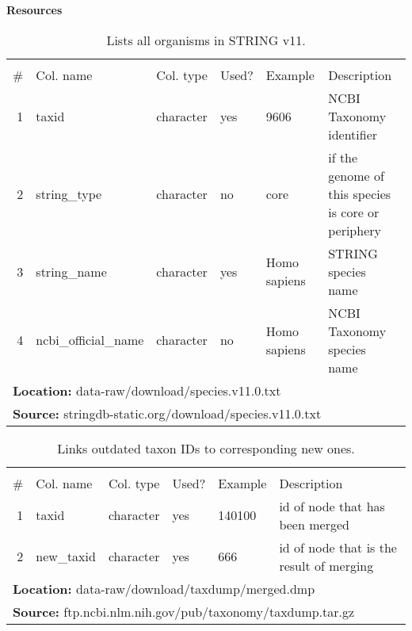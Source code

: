 \textbf{Resources}

\begin{table}[H]

\caption{\label{tab:string_species}Lists all organisms in STRING v11.}
\begin{tabular}[t]{rllll>{\raggedright\arraybackslash}p{18em}}
\toprule
\multicolumn{6}{c}{\bgroup\fontsize{12}{14}\selectfont \cellcolor[HTML]{EEEEEE}{\ttfamily{\textbf{string\_species}}}\egroup{}} \\
\cmidrule(l{3pt}r{3pt}){1-6}
\# & Col. name & Col. type & Used? & Example & Description\\
\midrule
\rowcolor{gray!6}  1 & taxid & character & yes & 9606 & NCBI Taxonomy identifier\\
2 & string\_type & character & no & core & if the genome of this species is core or periphery\\
\rowcolor{gray!6}  3 & string\_name & character & yes & Homo sapiens & STRING species name\\
4 & ncbi\_official\_name & character & no & Homo sapiens & NCBI Taxonomy species name\\
\bottomrule
\multicolumn{6}{l}{\textbf{Location: } data-raw/download/species.v11.0.txt}\\
\multicolumn{6}{l}{\textbf{Source: } stringdb-static.org/download/species.v11.0.txt}\\
\end{tabular}
\end{table}
\begin{table}[H]

\caption{\label{tab:ncbi_merged_ids}Links outdated taxon IDs to corresponding new ones.}
\begin{tabular}[t]{rllll>{\raggedright\arraybackslash}p{18em}}
\toprule
\multicolumn{6}{c}{\bgroup\fontsize{12}{14}\selectfont \cellcolor[HTML]{EEEEEE}{\ttfamily{\textbf{ncbi\_merged\_ids}}}\egroup{}} \\
\cmidrule(l{3pt}r{3pt}){1-6}
\# & Col. name & Col. type & Used? & Example & Description\\
\midrule
\rowcolor{gray!6}  1 & taxid & character & yes & 140100 & id of node that has been merged\\
2 & new\_taxid & character & yes & 666 & id of node that is the result of merging\\
\bottomrule
\multicolumn{6}{l}{\textbf{Location: } data-raw/download/taxdump/merged.dmp}\\
\multicolumn{6}{l}{\textbf{Source: } ftp.ncbi.nlm.nih.gov/pub/taxonomy/taxdump.tar.gz}\\
\end{tabular}
\end{table}
